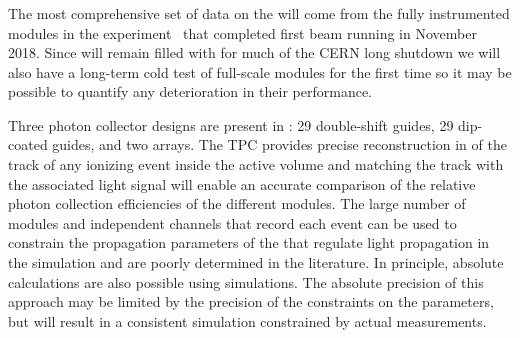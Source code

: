 


\subsubsection{}
\label{sec:valid-pdsp}

The most comprehensive set of data on the  will come from the fully instrumented modules in the  experiment~\cite{Abi:2017aow} that completed first beam running in November \num{2018}. 
Since  will remain filled with \lar for much of the CERN long shutdown we will also have a long-term cold test of full-scale  modules for the first time so it may be possible to quantify any deterioration in their performance.

Three photon collector designs are present in : \num{29} double-shift guides, \num{29} dip-coated guides, and two  arrays. 
The TPC provides precise reconstruction in \threed of the track of any ionizing event inside the active volume and matching the track with the associated light signal will enable an accurate comparison of the relative photon collection efficiencies of the different  modules. 
The large number of modules and independent channels that record each event can be used to constrain the propagation parameters of the \lar that regulate  light propagation in the simulation and are poorly determined in the literature. %
In principle, absolute calculations are also possible using  simulations.
The absolute precision of this approach may be limited by the precision of the constraints on the parameters, but will result in a consistent simulation constrained by actual measurements. 

